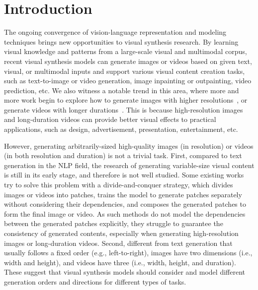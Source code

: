 \documentclass{article}
\begin{document}
\section{Introduction}
\vspace{-2mm}
\newcommand{\chapquote}[3]{\begin{quotation} \textit{#1} \end{quotation} \begin{flushright} - #2, \textit{#3}\end{flushright} }


The ongoing convergence of vision-language representation and modeling techniques brings new opportunities to visual synthesis research. By learning visual knowledge and patterns from a large-scale visual and multimodal corpus, recent visual synthesis models can generate images or videos based on given text, visual, or multimodal inputs and support various visual content creation tasks, such as text-to-image or video generation, image inpainting or outpainting, video prediction, etc. We also witness a notable trend in this area, where more and more work begin to explore how to generate images with higher resolutions~\cite{dingCogViewMasteringTexttoImage2021,rameshHierarchicalTextConditionalImage2022,skorokhodovAligningLatentImage2021,linInfinityGANInfinitePixelImage2022,changMaskGITMaskedGenerative2022}, or generate videos with longer durations~\cite{villegasHighFidelityVideo2019,clarkAdversarialVideoGeneration2019,liuInfiniteNaturePerpetual2021}. This is because high-resolution images and long-duration videos can provide 
better visual effects to practical applications, such as design, advertisement, presentation, entertainment, etc.

However, generating arbitrarily-sized high-quality images (in resolution) or videos (in both resolution and duration) is not a trivial task. First, compared to text generation in the NLP field, the research of generating variable-size visual content is still in its early stage, and therefore is not well studied. Some existing works~\cite{struskiLocoGANLocallyConvolutional2022,skorokhodovAligningLatentImage2021,esserTamingTransformersHighResolution2021,changMaskGITMaskedGenerative2022} try to solve this problem with a divide-and-conquer strategy, which divides images or videos into patches, trains the model to generate patches separately without considering their dependencies, and composes the generated patches to form the final image or video. As such methods do not model the dependencies between the generated patches explicitly, they struggle to guarantee the consistency of generated contents, especially when generating high-resolution images or long-duration videos. 
Second, different from text generation that usually follows a fixed order (e.g., left-to-right), images have two dimensions (i.e., width and height), and videos have three (i.e., width, height, and duration). These suggest that visual synthesis models should consider and model different generation orders and directions for different types of tasks.
\end{document}
